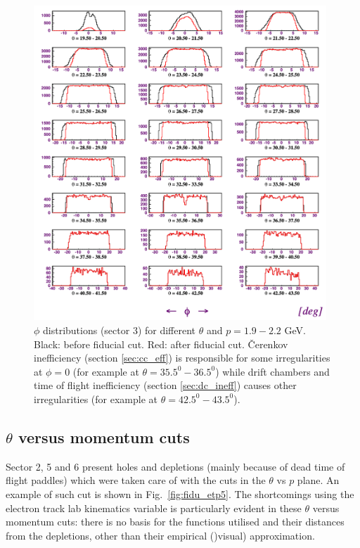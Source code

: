 \begin{figure}[ht]
    \centering
    \includegraphics[width=0.98\textwidth ]{img/electron_phis}
    \caption{$\phi$ distributions (sector 3) for different $\theta$ and
        $p=1.9-2.2$ GeV. Black: before fiducial cut. Red: after fiducial cut.
        \v Cerenkov inefficiency (section \ref{sec:cc_eff}) is responsible
        for some irregularities at $\phi = 0$ (for example at
        $\theta = 35.5^0 - 36.5^0$) while drift chambers and time of flight
        inefficiency (section \ref{sec:dc_ineff}) causes other irregularities
        (for example at  $\theta = 42.5^0 - 43.5^0$).}
    \label{fig:fidu_ephis}
\end{figure}


\clearpage\newpage




\subsection{ $\theta$ versus momentum cuts}
Sector 2, 5 and 6 present holes and depletions (mainly because of dead time of flight paddles)
which were taken care of with the
cuts in the $\theta$ vs $p$ plane. An example of such cut is shown in Fig.~\ref{fig:fidu_etp5}.
The shortcomings using the electron track lab kinematics variable
is particularly evident in these  $\theta$ versus momentum cuts: there is no basis
for the functions utilised and their distances from the depletions, other than
their empirical ()visual) approximation.

